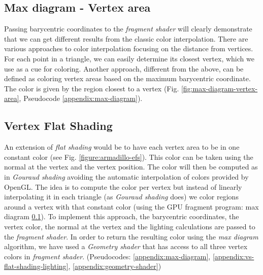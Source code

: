 
\subsection{Max diagram - Vertex area} \label{section:max-diagram}
Passing barycentric coordinates to the \textit{fragment shader} will clearly demonstrate that we can get different results from the classic color interpolation. \cite{WEBSITE:redbloggames}
There are various approaches to color interpolation focusing on the distance from vertices. For each point in a triangle, we can easily determine its closest vertex, which we use as a cue for coloring.
Another approach, different from the above, can be defined as coloring vertex areas based on the maximum barycentric coordinate.
The color is given by the region closest to a vertex (Fig. \ref{fig:max-diagram-vertex-area}, Pseudocode \ref{appendix:max-diagram}).


\subsection{Vertex Flat Shading} \label{section:extend-flat-shading-lighting}
An extension of \textit{flat shading} would be to have each vertex area to be in one constant color (see Fig. \ref{figure:armadillo-efs}). This color can be taken using the normal at the vertex and the vertex position.
The color will then be computed as in \textit{Gouraud shading} avoiding the automatic interpolation of colors provided by OpenGL.
The idea is to compute the color per vertex but instead of linearly interpolating it in each triangle (as \textit{Gouraud shading} does) we color regions around a vertex with that constant color (using the GPU fragment program: max diagram \ref{section:max-diagram}).
To implement this approach, the barycentric coordinates, the vertex color, the normal at the vertex and the lighting calculations are passed to the \textit{fragment shader}.
In order to return the resulting color using the \textit{max diagram} algorithm, we have used a \textit{Geometry shader} that has access to all three vertex colors in \textit{fragment shader}. (Pseudocodes: \ref{appendix:max-diagram}, \ref{appendix:vs-flat-shading-lighting}, \ref{appendix:geometry-shader})

